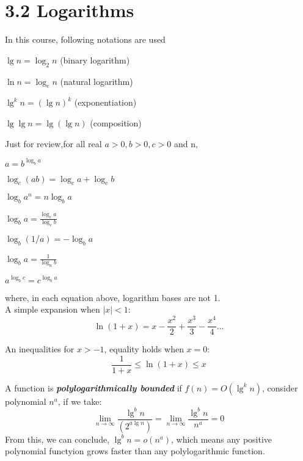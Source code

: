 \documentclass{article}
\begin{document}
\section*{3.2 Logarithms}
In this course, following notations are used

\hspace{5.5cm} $\lg n = \log_2 n $ (binary logarithm)

\hspace{5.5cm} $\ln n = \log_e n $ (natural logarithm)

\hspace{5.5cm} $\lg^k n = (\lg n)^k $ (exponentiation)

\hspace{5.5cm} $\lg \lg n = \lg (\lg n) $ (composition)

Just for review,for all real  $a>0, b>0, c>0$ and n, 


\hspace{5.5cm}$a =b^{\log _{b} a}$ 

\hspace{5.5cm}$\log_{c}(a b) =\log_{c} a+\log _{c} b $

\hspace{5.5cm}$\log_{b} a^{n} =n \log_{b} a $

\hspace{5.5cm}$\log_{b} a =\frac{\log_{c} a}{\log _{c} b}$ 

\hspace{5.5cm}$\log_{b}(1 / a) =-\log_{b} a $

\hspace{5.5cm}$\log_{b} a =\frac{1}{\log_{a} b}$ 

\hspace{5.5cm}$a^{\log_{b} c} =c^{\log_{b} a}$


where, in each equation above, logarithm bases are not 1.\\

A simple expansion when $|x| < 1$:
\[\ln(1+x) = x - \frac{x^2}{2}+\frac{x^3}{3}-\frac{x^4}{4} \text{...}\]

An inequalities for $x > -1$, equality holds when $x = 0$:
\[\frac{1}{1+x} \leq \ln(1+x) \leq x\]

A function is \textbf{\textit{polylogarithmically bounded}} if $f(n) = O(\lg^k n)$, consider polynomial $n^a$, if we take:
\[\lim_{n\to\infty}\frac{\lg^b n}{(2^{a\lg n})} = \lim_{n\to\infty}\frac{\lg^b n}{n^a} = 0\]
From this, we can conclude, $\lg^b n = o(n^a)$, which means any positive polynomial functyion grows faster than any polylogarithmic function.
\end{document}

